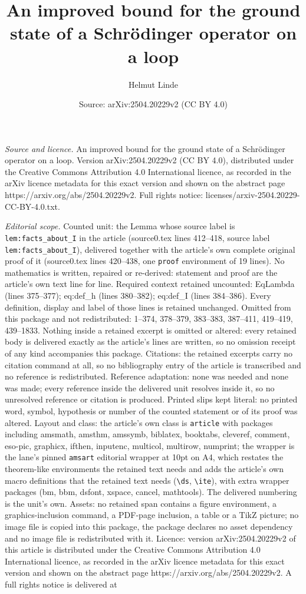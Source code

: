 \documentclass[10pt,a4paper]{amsart}
\title[An improved bound for the ground state of a Schr\"odinger op]{An improved bound for the ground state of a Schr\"odinger operator on a loop}
\author{Helmut Linde}
\date{Source: arXiv:2504.20229v2 (CC BY 4.0)}
\begin{document}
\maketitle

\noindent\emph{Source and licence.} An improved bound for the ground state of a Schr\"odinger operator on a loop. Version arXiv:2504.20229v2 (CC BY 4.0), distributed under the Creative Commons Attribution 4.0 International licence, as recorded in the arXiv licence metadata for this exact version and shown on the abstract page https://arxiv.org/abs/2504.20229v2. Full rights notice: licenses/arxiv-2504.20229-CC-BY-4.0.txt.\par\smallskip

\noindent\textit{Editorial scope.} Counted unit: the Lemma whose source label is \texttt{lem:facts\_about\_I} in the article (source0.tex lines 412--418, source label \texttt{lem:facts\_about\_I}), delivered together with the article's own complete original proof of it (source0.tex lines 420--438, one \texttt{proof} environment of 19 lines). No mathematics is written, repaired or re-derived: statement and proof are the article's own text line for line. Required context retained uncounted: EqLambda (lines 375--377); eq:def\_h (lines 380--382); eq:def\_I (lines 384--386). Every definition, display and label of those lines is retained unchanged. Omitted from this package and not redistributed: 1--374, 378--379, 383--383, 387--411, 419--419, 439--1833. Nothing inside a retained excerpt is omitted or altered: every retained body is delivered exactly as the article's lines are written, so no omission receipt of any kind accompanies this package. Citations: the retained excerpts carry no citation command at all, so no bibliography entry of the article is transcribed and no reference is redistributed. Reference adaptation: none was needed and none was made; every reference inside the delivered unit resolves inside it, so no unresolved reference or citation is produced. Printed slips kept literal: no printed word, symbol, hypothesis or number of the counted statement or of its proof was altered. Layout and class: the article's own class is \texttt{article} with packages including amsmath, amsthm, amssymb, biblatex, booktabs, cleveref, comment, eso-pic, graphicx, ifthen, inputenc, multicol, multirow, numprint; the wrapper is the lane's pinned \texttt{amsart} editorial wrapper at 10pt on A4, which restates the theorem-like environments the retained text needs and adds the article's own macro definitions that the retained text needs (\texttt{\textbackslash ds}, \texttt{\textbackslash ite}), with extra wrapper packages (bm, bbm, dsfont, xspace, cancel, mathtools). The delivered numbering is the unit's own. Assets: no retained span contains a figure environment, a graphics-inclusion command, a PDF-page inclusion, a table or a TikZ picture; no image file is copied into this package, the package declares no asset dependency and no image file is redistributed with it. Licence: version arXiv:2504.20229v2 of this article is distributed under the Creative Commons Attribution 4.0 International licence, as recorded in the arXiv licence metadata for this exact version and shown on the abstract page https://arxiv.org/abs/2504.20229v2. A full rights notice is delivered at 
\end{document}
